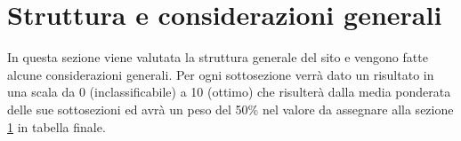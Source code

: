 \section{Struttura e considerazioni generali}\label{struct}
In questa sezione viene valutata la struttura generale del sito e vengono 
fatte alcune considerazioni generali. Per ogni sottosezione verrà dato un risultato
in una scala da 0 (inclassificabile) a 10 (ottimo) che risulterà dalla media 
ponderata delle sue sottosezioni ed avrà un peso del 50\% nel valore da assegnare
alla sezione \ref{struct} in tabella finale.
  
  
